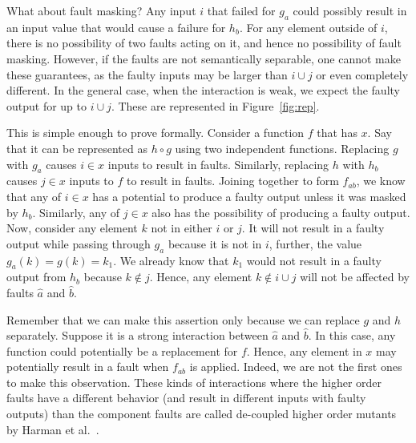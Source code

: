 \documentclass[preprint,nonatbib]{sigplanconf}\usepackage[]{graphicx}\usepackage[]{color}
\begin{document}
What about fault masking? Any input $i$ that failed for $g_a$ could possibly
result in an input value that would cause a failure for $h_b$. For any element
outside of $i$, there is no possibility of two faults acting on it, and hence
no possibility of fault masking.
However, if the faults are not semantically separable, one cannot make these
guarantees, as the faulty inputs may be larger than $i \cup j$ or even
completely different. In the general case, when the interaction is weak, we
expect the faulty output for up to $i \cup j$.
These are represented in Figure~\ref{fig:rep}.

This is simple enough to prove formally. Consider a function $f$ that has \finput $x$. Say
that it can be represented as $h \circ g$ using two independent functions.
Replacing $g$ with $g_a$ causes $i \in x$ inputs to result in faults.
Similarly, replacing $h$ with $h_b$ causes $j \in x$ inputs to $f$ to result in
faults. Joining together to form $f_{ab}$, we know that any of $i \in x$ has a
potential to produce a faulty output unless it was masked by $h_b$. Similarly,
any of $j \in x$ also has the possibility of producing a faulty output.
Now, consider any element $k$ not in either $i$ or $j$. It will not result in
a faulty output while passing through $g_a$ because it is not in $i$, further,
the value $g_a(k) = g(k) = k_1$. We already know that $k_1$ would not result in
a faulty output from $h_b$ because $k \notin j$. Hence, any element
$k \notin i \cup j$ will not be affected by faults $\hat{a}$ and $\hat{b}$.

Remember that we can make this assertion only because we can replace $g$ and
$h$ separately. Suppose it is a strong interaction between $\hat{a}$ and $\hat{b}$.
In this case, any function could potentially be a replacement for $f$. Hence, any
element in $x$ may potentially result in a fault when $f_{ab}$ is applied. Indeed,
we are not the first ones to make this observation. These kinds of interactions
where the higher order faults have a different behavior (and result in different
inputs with faulty outputs) than the component
faults are called de-coupled higher order mutants by Harman et al.~\cite{harman2010manifesto}.
\end{document}
